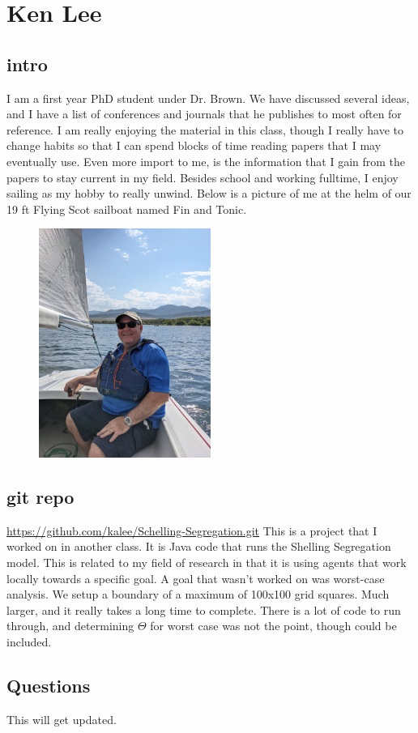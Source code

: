 \section{Ken Lee}
\subsection{intro}
I am a first year PhD student under Dr. Brown.  
We have discussed several ideas, and I have a list of conferences and journals that he publishes to most often for reference.
I am really enjoying the material in this class, though I really have to change habits so that I can spend blocks of time reading papers that I may eventually use.  
Even more import to me, is the information that I gain from the papers to stay current in my field.
Besides school and working fulltime, I enjoy sailing as my hobby to really unwind.  
Below is a picture of me at the helm of our 19 ft Flying Scot sailboat named Fin and Tonic.
\begin{figure}[!htb]
\centering
\includegraphics[width=0.5\textwidth]{sailing_flyingscot.jpg}
\end{figure}

\subsection{git repo}
\url{https://github.com/kalee/Schelling-Segregation.git} This is a project that I worked on in another class.  
It is Java code that runs the Shelling Segregation model.  
This is related to my field of research in that it is using agents that work locally towards a specific goal.  
A goal that wasn't worked on was worst-case analysis.  
We setup a boundary of a maximum of 100x100 grid squares.  
Much larger, and it really takes a long time to complete.  
There is a lot of code to run
through, and determining $\Theta$ for worst case was not the point, though could be included.

\subsection{Questions}
This will get updated.
